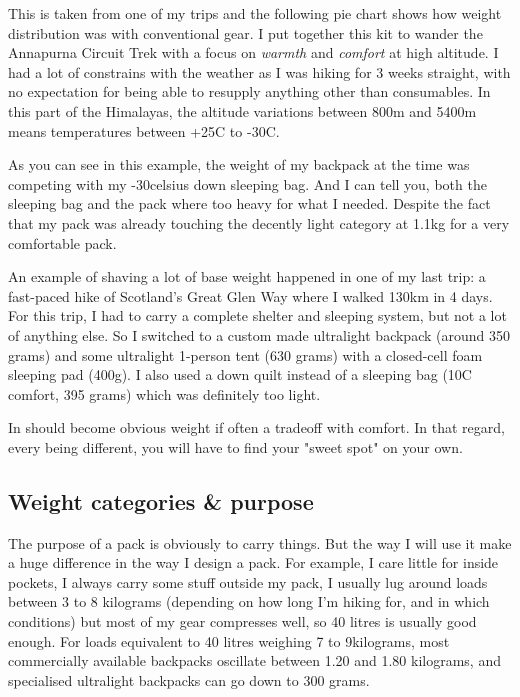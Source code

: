 This is taken from one of my trips and the following pie chart shows how weight distribution was with conventional gear. I put together this kit to wander the Annapurna Circuit Trek with a focus on \textit{warmth} and \textit{comfort} at high altitude. I had a lot of constrains with the weather as I was hiking for 3 weeks straight, with no expectation for being able to resupply anything other than consumables. In this part of the Himalayas, the altitude variations between 800m and 5400m means temperatures between +25\degree C to -30\degree C.



As you can see in this example, the weight of my backpack at the time was competing with my -30\degree celsius down sleeping bag. And I can tell you, both the sleeping bag and the pack where too heavy for what I needed. Despite the fact that my pack was already touching the decently light category at 1.1kg for a very comfortable pack.

An example of shaving a lot of base weight happened in one of my last trip: a fast-paced hike of Scotland's Great Glen Way where I walked 130km in 4 days. For this trip, I had to carry a complete shelter and sleeping system, but not a lot of anything else. So I switched to a custom made ultralight backpack (around 350 grams) and some ultralight 1-person tent (630 grams) with a closed-cell foam sleeping pad (400g). I also used a down quilt instead of a sleeping bag (10\degree C comfort, 395 grams) which was definitely too light.

In should become obvious weight if often a tradeoff with comfort. In that regard, every being different, you will have to find your "sweet spot" on your own.



\subsection{Weight categories \& purpose}

The purpose of a pack is obviously to carry things. But the way I will use it make a huge difference in the way I design a pack. For example, I care little for inside pockets, I always carry some stuff outside my pack, I usually lug around loads between 3 to 8 kilograms (depending on how long I'm hiking for, and in which conditions) but most of my gear compresses well, so 40 litres is usually good enough.
For loads equivalent to 40 litres weighing 7 to 9kilograms, most commercially available backpacks oscillate between 1.20 and 1.80 kilograms, and specialised ultralight backpacks can go down to 300 grams.
